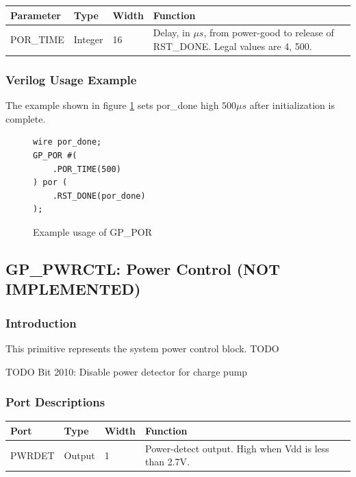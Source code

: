 \documentclass{article}
\begin{document}
\begin{tabularx}{5in}{|l|l|l|X|}
\hline
{\bfseries Parameter} & {\bfseries Type} & {\bfseries Width} & {\bfseries Function} \\
\hline
POR\_TIME & Integer & 16 & Delay, in $\mu s$, from power-good to release of RST\_DONE. Legal values are 4, 500.\\
\hline
\end{tabularx}

\subsubsection{Verilog Usage Example}

The example shown in figure \ref{gp-por-example} sets por\_done high $500 \mu s$ after initialization is complete.

\begin{figure}[h]
\begin{lstlisting}
wire por_done;
GP_POR #(
	.POR_TIME(500)
) por (
	.RST_DONE(por_done)
);
\end{lstlisting}
\caption{Example usage of GP\_POR}
\label{gp-por-example}
\end{figure}



\pagebreak
\clearpage
\subsection{GP\_PWRCTL: Power Control (NOT IMPLEMENTED)}

\subsubsection{Introduction}
This primitive represents the system power control block. TODO


TODO
Bit 2010: Disable power detector for charge pump

\subsubsection{Port Descriptions}

\begin{tabularx}{5in}{|l|l|l|X|}
\hline
{\bfseries Port} & {\bfseries Type} & {\bfseries Width} & {\bfseries Function} \\
\hline
PWRDET & Output & 1 & Power-detect output. High when Vdd is less than 2.7V.\\
\hline
\end{tabularx}
\end{document}
